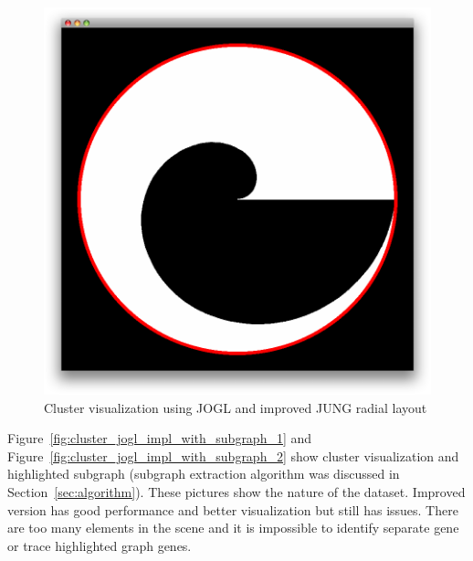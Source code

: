 \begin{figure}[h!]
\centering
\includegraphics[scale=0.4]{pictures/cluster_jogl_impl.png}
\caption{Cluster visualization using JOGL and improved JUNG radial layout}
\label{fig:cluster_jogl_impl}
\end{figure}


Figure~\ref{fig:cluster_jogl_impl_with_subgraph_1} and Figure~\ref{fig:cluster_jogl_impl_with_subgraph_2}
show cluster visualization and highlighted subgraph (subgraph extraction algorithm was discussed in Section~\ref{sec:algorithm}).
These pictures show the nature of the dataset. Improved version has good performance and better visualization but still has issues.
There are too many elements in the scene and it is impossible to identify separate gene or trace highlighted graph genes.

